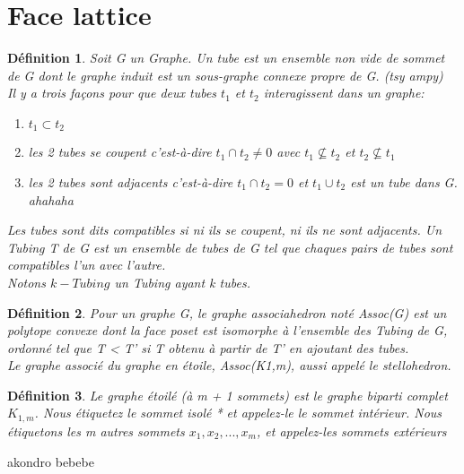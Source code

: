 \documentclass{book}
\newtheorem{petit_nom2}{Définition}[chapter]
\begin{document}
\section{Face lattice}
\begin{petit_nom2}
Soit G un Graphe. Un \textit{tube} est un ensemble non vide de sommet de G dont le graphe induit est un sous-graphe connexe propre de G. (tsy ampy)\\
Il y a trois façons pour que deux tubes $t_1$ et $t_2$ interagissent dans un graphe:
\begin{enumerate}
\item $t_1 \subset t_2$
\item les 2 tubes se coupent c'est-à-dire $t_1 \cap t_2 \neq 0$ avec $ t_1 \nsubseteq t_2$ et $t_2 \nsubseteq t_1 $
\item les 2 tubes sont adjacents c'est-à-dire $t_1 \cap t_2 = 0$ et $t_1 \cup t_2$ est un tube dans G. ahahaha
\end{enumerate}
Les tubes sont dits compatibles si ni ils se coupent, ni ils ne sont adjacents. Un Tubing T de G est un ensemble 
de tubes de G tel que chaques pairs de tubes sont compatibles  l'un avec l'autre.\\
Notons $k-Tubing$ un Tubing ayant k tubes.\\
\end{petit_nom2}

\begin{petit_nom2}
  Pour un graphe G, le graphe associahedron noté \textit{Assoc(G)} est un polytope convexe dont la face poset est isomorphe à l'ensemble des Tubing de G, ordonné tel que T < T'
  si T obtenu à partir de T' en ajoutant des tubes.\\
  Le graphe associé du graphe en étoile, Assoc(K1,m), aussi appelé le \textit{stellohedron}.\\
\end{petit_nom2}

\begin{petit_nom2}
  Le graphe étoilé (à m + 1 sommets) est le graphe biparti complet $K_{1,m}$. Nous
étiquetez le sommet isolé * et appelez-le le sommet intérieur. Nous étiquetons les m autres sommets $x_1, x_2, . . . , x_m$,
et appelez-les sommets extérieurs
\end{petit_nom2}

akondro bebebe
\end{document}
